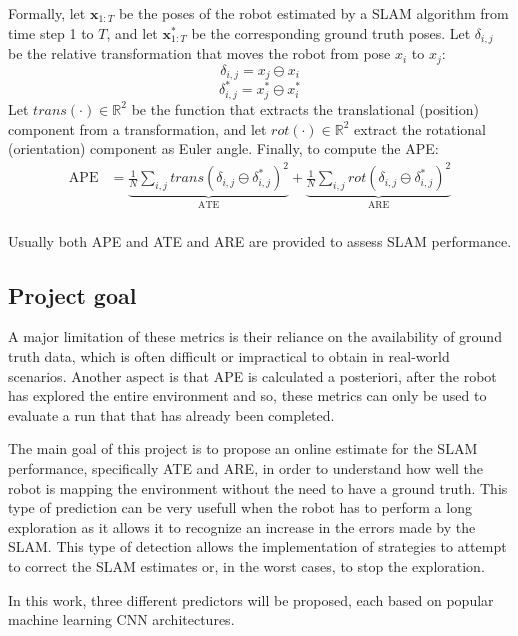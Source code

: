 \noindent
Formally, let $\bm{x}_{1:T}$ be the poses of the robot estimated by
a SLAM algorithm from time step 1 to $T$, and let $\bm{x}^*_{1:T}$ be the corresponding ground truth poses.
\noindent
Let $\delta_{i,j}$ be the relative transformation that moves the robot from pose $x_i$ to $x_j$:
$$ \delta_{i,j}=x_j\ominus x_i $$
$$ \delta^*_{i,j}=x^*_j\ominus x^*_i $$ 
\noindent
Let $trans(\cdot)\in\mathbb{R}^2$ be the function that extracts the translational (position) component from a 
transformation, and let $rot(\cdot)\in\mathbb{R}^2$ extract the rotational (orientation) component as Euler angle.
\noindent
Finally, to compute the APE: 
$$
\begin{aligned}
    \displaystyle
    \text{APE} &= \underbrace{\frac{1}{N}\sum_{i,j}trans(\delta_{i,j}\ominus\delta^*_{i,j})^2}_{\text{ATE}}+
                  \underbrace{\frac{1}{N}\sum_{i,j}rot(\delta_{i,j}\ominus\delta^*_{i,j})^2}_{\text{ARE}} \\
\end{aligned}
$$

\noindent
Usually both APE and ATE and ARE are provided to assess SLAM performance.

\subsection{Project goal}
A major limitation of these metrics is their reliance on the availability of ground truth data, which is often 
difficult or impractical to obtain in real-world scenarios. Another aspect is that APE is calculated a posteriori, after the robot has explored the entire environment and so, these metrics can only be used to evaluate a run that
that has already been completed.

The main goal of this project is to propose an online estimate for the SLAM performance, specifically ATE and ARE,
in order to understand how well the robot is mapping the environment without the need to have a ground truth. This
type of prediction can be very usefull when the robot has to perform a long exploration as it allows it to recognize
an increase in the errors made by the SLAM. This type of detection allows the implementation of strategies to attempt to correct the SLAM estimates or, in the worst cases, to stop the exploration.

In this work, three different predictors will be proposed, each based on popular machine learning CNN 
architectures.
